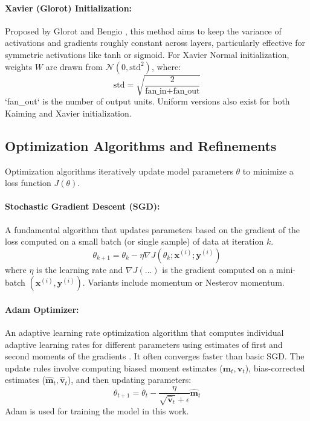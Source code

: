 \begin{appendices}
  \paragraph{Xavier (Glorot) Initialization:}
  Proposed by Glorot and Bengio \autocite{glorot2010understanding}, this method aims to keep the variance of activations and gradients roughly constant across layers, particularly effective for symmetric activations like tanh or sigmoid. For Xavier Normal initialization, weights \( W \) are drawn from \( \mathcal{N}(0, \text{std}^2) \), where:
  \begin{equation}
    \text{std} = \sqrt{\frac{2}{\text{fan\_in} + \text{fan\_out}}}
  \end{equation}
  `fan\_out` is the number of output units. Uniform versions also exist for both Kaiming and Xavier initialization.

  \subsection{Optimization Algorithms and Refinements}
  Optimization algorithms iteratively update model parameters \( \theta \) to minimize a loss function \( J(\theta) \).

  \paragraph{Stochastic Gradient Descent (SGD):}
  A fundamental algorithm that updates parameters based on the gradient of the loss computed on a small batch (or single sample) of data at iteration \( k \).
  \begin{equation}
    \theta_{k+1} = \theta_k - \eta \nabla J(\theta_k; \bm{x}^{(i)}; \bm{y}^{(i)})
  \end{equation}
  where \( \eta \) is the learning rate and \( \nabla J(...) \) is the gradient computed on a mini-batch \( (\bm{x}^{(i)}, \bm{y}^{(i)}) \). Variants include momentum or Nesterov momentum.

  \paragraph{Adam Optimizer:}
  \label{eq:adam}
  An adaptive learning rate optimization algorithm that computes individual adaptive learning rates for different parameters using estimates of first and second moments of the gradients \autocite{kingma2014adam}. It often converges faster than basic SGD. The update rules involve computing biased moment estimates (\( \bm{m}_t, \bm{v}_t \)), bias-corrected estimates (\( \hat{\bm{m}}_t, \hat{\bm{v}}_t \)), and then updating parameters:
  \begin{equation}
    \theta_{t+1} = \theta_t - \frac{\eta}{\sqrt{\hat{\bm{v}}_t} + \epsilon} \hat{\bm{m}}_t
    \label{eq:adam-update} %
  \end{equation}
  Adam is used for training the model in this work.


\end{appendices}
